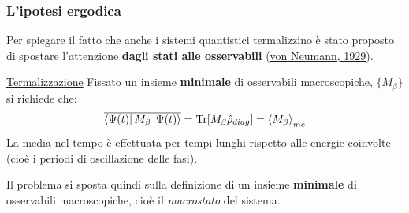 \documentclass[10pt]{beamer}
\theoremstyle{definition}
\theoremstyle{plain}
\begin{document}

%

\begin{frame}
	\frametitle{L'ipotesi ergodica}
	
	Per spiegare il fatto che anche i sistemi quantistici termalizzino è stato proposto di spostare l'attenzione \textbf{dagli stati alle osservabili} \hyperlink{bib}{(von Neumann, 1929)}.
	
	\pause
	\begin{block}{\hyperlink{termdef2}{Termalizzazione}}
		Fissato un insieme \textbf{minimale} di osservabili macroscopiche, $\{ M_\beta \}$ si richiede che:
		\begin{equation*}
			\overline{\bra{\Psi(t)} M_\beta \ket{\Psi(t)}} = \Tr[M_\beta \hat{\rho}_{diag}] = \expval{M_\beta}_{mc}
		\end{equation*}
		{\footnotesize La media nel tempo è effettuata per tempi lunghi rispetto alle energie coinvolte (cioè i periodi di oscillazione delle fasi).}
	\end{block}
	
	\pause
	Il problema si sposta quindi sulla definizione di un insieme \textbf{minimale} di osservabili macroscopiche, cioè il \textit{macrostato} del sistema.
\end{frame}
\end{document}
